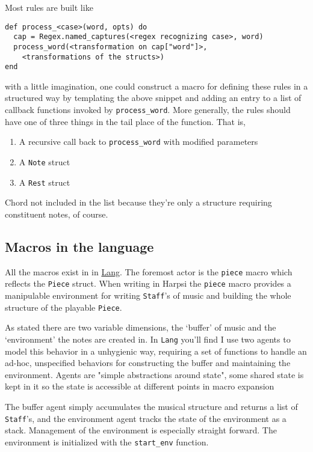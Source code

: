 \documentclass[11pt]{article}
\begin{document}
Most rules are built like
\begin{verbatim}
def process_<case>(word, opts) do
  cap = Regex.named_captures(<regex recognizing case>, word)
  process_word(<transformation on cap["word"]>,
    <transformations of the structs>)
end
\end{verbatim}
with a little imagination, one could construct a macro for defining
these rules in a structured way by templating the above snippet and
adding an entry to a list of callback functions invoked by
\texttt{process\_word}. More generally, the rules should have one of three
things in the tail place of the function. That is,
\begin{enumerate}
\item A recursive call back to \texttt{process\_word} with modified parameters
\item A \texttt{Note} struct
\item A \texttt{Rest} struct
\end{enumerate}
Chord not included in the list because they're only a structure
requiring constituent notes, of course.

\subsection{Macros in the language}
\label{sec-3-2}
All the macros exist in in \href{lib/lang.ex}{Lang}. The foremost actor is
the \texttt{piece} macro which reflects the \texttt{Piece} struct. When writing
in Harpsi the \texttt{piece} macro provides a manipulable environment for
writing \texttt{Staff}'s of music and building the whole structure of the
playable \texttt{Piece}.

As stated there are two variable dimensions, the `buffer' of music
and the `environment' the notes are created in. In \texttt{Lang} you'll
find I use two agents to model this behavior in a unhygienic way,
requiring a set of functions to handle an ad-hoc, unspecified
behaviors for constructing the buffer and maintaining the
environment. Agents are "simple abstractions around state", some
shared state is kept in it so the state is accessible at different
points in macro expansion

The buffer agent simply accumulates the musical structure and
returns a list of \texttt{Staff}'s, and the environment agent tracks the
state of the environment as a stack. Management of the environment
is especially straight forward. The environment is initialized with
the \texttt{start\_env} function.
\end{document}
